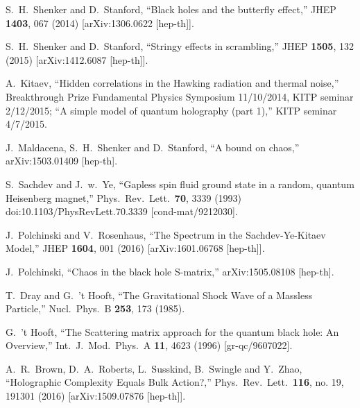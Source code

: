 \documentclass[12pt]{article}
\begin{document}
\begin{thebibliography}{99}
  S.~H.~Shenker and D.~Stanford,
  ``Black holes and the butterfly effect,''
  JHEP {\bf 1403}, 067 (2014)
  [arXiv:1306.0622 [hep-th]].
   
  S.~H.~Shenker and D.~Stanford,
  ``Stringy effects in scrambling,''
  JHEP {\bf 1505}, 132 (2015)
   [arXiv:1412.6087 [hep-th]].
  
A.~Kitaev,
``Hidden correlations in the Hawking radiation and thermal noise,'' Breakthrough Prize Fundamental Physics Symposium 11/10/2014, KITP seminar 2/12/2015; 	``A simple model of quantum holography (part 1),'' KITP seminar 4/7/2015.
  

  J.~Maldacena, S.~H.~Shenker and D.~Stanford,
  ``A bound on chaos,''
  arXiv:1503.01409 [hep-th].
  
  S.~Sachdev and J.~w.~Ye,
  ``Gapless spin fluid ground state in a random, quantum Heisenberg magnet,''
  Phys.\ Rev.\ Lett.\  {\bf 70}, 3339 (1993)
  doi:10.1103/PhysRevLett.70.3339
  [cond-mat/9212030].

  J.~Polchinski and V.~Rosenhaus,
  ``The Spectrum in the Sachdev-Ye-Kitaev Model,''
  JHEP {\bf 1604}, 001 (2016)
    [arXiv:1601.06768 [hep-th]]. 
   
  J.~Polchinski,
  ``Chaos in the black hole S-matrix,''
  arXiv:1505.08108 [hep-th].

  T.~Dray and G.~'t Hooft,
  ``The Gravitational Shock Wave of a Massless Particle,''
  Nucl.\ Phys.\ B {\bf 253}, 173 (1985).
  
  G.~'t Hooft,
  ``The Scattering matrix approach for the quantum black hole: An Overview,''
  Int.\ J.\ Mod.\ Phys.\ A {\bf 11}, 4623 (1996)
  [gr-qc/9607022].

  A.~R.~Brown, D.~A.~Roberts, L.~Susskind, B.~Swingle and Y.~Zhao,
  ``Holographic Complexity Equals Bulk Action?,''
  Phys.\ Rev.\ Lett.\  {\bf 116}, no. 19, 191301 (2016)
  [arXiv:1509.07876 [hep-th]].
  
 \end{thebibliography}
 
\end{document}
